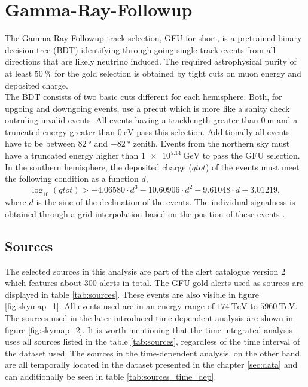 \section{Gamma-Ray-Followup}

The Gamma-Ray-Followup track selection, GFU for short, is a pretrained binary decision tree (BDT) identifying through going single track events from all directions that are likely neutrino induced.
The required astrophysical purity of at least $\SI{50}{\percent}$ for the gold selection is obtained by tight cuts on muon energy and deposited charge.\\
The BDT consists of two basic cuts different for each hemisphere.
Both, for upgoing and downgoing events, use a precut which is more like a sanity check outruling invalid events.
All events having a tracklength greater than $\SI{0}{\meter}$ and a truncated energy greater than $\SI{0}{\electronvolt}$ pass this selection.
Additionally all events have to be between $\SI{82}{\degree}$ and $\SI{-82}{\degree}$ zenith.
Events from the northern sky must have a truncated energy higher than $\SI{1e5.14}{\giga\electronvolt}$ to pass the GFU selection.
In the southern hemisphere, the deposited charge ($qtot$) of the events must meet the following condition as a function $d$,
\begin{equation}
  \log_{10}(qtot) > -4.06580\cdot d^3 - 10.60906\cdot d^2  -9.61048\cdot d + 3.01219,
\end{equation}
where $d$ is the sine of the declination of the events.
The individual signalness is obtained through a grid interpolation based on the position of these events \cite{track_alert_paper}.

\subsection{Sources}

The selected sources in this analysis are part of the alert catalogue version 2 which features about $\num{300}$ alerts in total.
The GFU-gold alerts used as sources are displayed in table \ref{tab:sources}.
These events are also visible in figure \ref{fig:skymap_1}.
All events used are in an energy range of $\SI{174}{\tera\electronvolt}$ to $\SI{5960}{\tera\electronvolt}$.
The sources used in the later introduced time-dependent analysis are shown in figure \ref{fig:skymap_2}.
It is worth mentioning that the time integrated analysis uses all sources listed in the table \ref{tab:sources}, regardless of the time interval of the dataset used.
The sources in the time-dependent analysis, on the other hand, are all temporally located in the dataset presented in the chapter \ref{sec:data} and can additionally be seen in table \ref{tab:sources_time_dep}.

